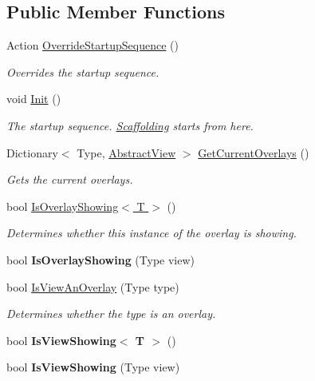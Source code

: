 \subsection*{Public Member Functions}
\begin{DoxyCompactItemize}
\item 
Action \hyperlink{class_scaffolding_1_1_view_manager_a8b9e5f3a4043a28c2b7d123724ae87b4}{Override\+Startup\+Sequence} ()
\begin{DoxyCompactList}\small\item\em Overrides the startup sequence. \end{DoxyCompactList}\item 
void \hyperlink{class_scaffolding_1_1_view_manager_a8da654dc78dfd8839c7680315bedd382}{Init} ()
\begin{DoxyCompactList}\small\item\em The startup sequence. \hyperlink{namespace_scaffolding}{Scaffolding} starts from here. \end{DoxyCompactList}\item 
Dictionary$<$ Type, \hyperlink{class_scaffolding_1_1_abstract_view}{Abstract\+View} $>$ \hyperlink{class_scaffolding_1_1_view_manager_a5674ccdc20f2afe33e0f55838fc05f27}{Get\+Current\+Overlays} ()
\begin{DoxyCompactList}\small\item\em Gets the current overlays. \end{DoxyCompactList}\item 
bool \hyperlink{class_scaffolding_1_1_view_manager_a92a53e48d3ba9701d471f52baeb1f98d}{Is\+Overlay\+Showing$<$ T $>$} ()
\begin{DoxyCompactList}\small\item\em Determines whether this instance of the overlay is showing. \end{DoxyCompactList}\item 
\hypertarget{class_scaffolding_1_1_view_manager_a49df4475ef01fb584d6c67df641763a9}{bool {\bfseries Is\+Overlay\+Showing} (Type view)}\label{class_scaffolding_1_1_view_manager_a49df4475ef01fb584d6c67df641763a9}

\item 
bool \hyperlink{class_scaffolding_1_1_view_manager_a85f6fe3eff8b8fabfc846ba3fc109a4a}{Is\+View\+An\+Overlay} (Type type)
\begin{DoxyCompactList}\small\item\em Determines whether the type is an overlay. \end{DoxyCompactList}\item 
\hypertarget{class_scaffolding_1_1_view_manager_a25c9e93c61fcdc0ace620525239d1e5f}{bool {\bfseries Is\+View\+Showing$<$ T $>$} ()}\label{class_scaffolding_1_1_view_manager_a25c9e93c61fcdc0ace620525239d1e5f}

\item 
\hypertarget{class_scaffolding_1_1_view_manager_ac884bcebbcf2c931725299e56e37e2da}{bool {\bfseries Is\+View\+Showing} (Type view)}\label{class_scaffolding_1_1_view_manager_ac884bcebbcf2c931725299e56e37e2da}

\end{DoxyCompactItemize}
